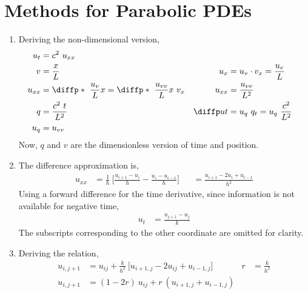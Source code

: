 \section{Methods for Parabolic PDEs}

\begin{enumerate}
    \item Deriving the non-dimensional version,
          \begin{align}
              u_t       & = c^2\ u_{xx}                             \\
              v         & = \frac{x}{L}                           &
              u_{x}     & = u_v \cdot v_x = \frac{u_v}{L}           \\
              u_{xx}    & = \diffp*{\ \frac{u_v}{L}}{x} = \diffp*
              {\ \frac{u_{vv}}{L}}{x}
              \ v_x     &
              u_{xx}    & = \frac{u_{vv}}{L^2}                      \\
              q         & = \frac{c^2\ t}{L^2}                    &
              \diffp ut & = u_q\ q_t = u_q\ \frac{c^2}{L^2}         \\
              u_q       & = u_{vv}
          \end{align}
          Now, $ q $ and $ v $ are the dimensionless version of time and position.

    \item The difference approximation is,
          \begin{align}
              u_{xx} & = \frac{1}{h}\ \Bigg[ \frac{u_{i+1}- u_i}{h}
                  - \frac{u_i - u_{i-1}}{h} \Bigg]
                     &
                     & = \frac{u_{i+1} -  2u_i + u_{i-1}}{h^2}
          \end{align}
          Using a forward difference for the time derivative, since information is not
          available for negative time,
          \begin{align}
              u_t & = \frac{u_{j+1} - u_j}{k}
          \end{align}
          The subscripts corresponding to the other coordinate are omitted for clarity.

    \item Deriving the relation,
          \begin{align}
              u_{i,j+1}         & = u_{ij} + \frac{k}{h^2}\ \Bigg[u_{i+1,j} - 2u_{ij}
              + u_{i-1,j}\Bigg] &
              r                 & = \frac{k}{h^2}                                     \\
              u_{i,j+1}         & = (1-2r)\ u_{ij} + r\ (u_{i+1,j} + u_{i-1,j})
          \end{align}


\end{enumerate}
